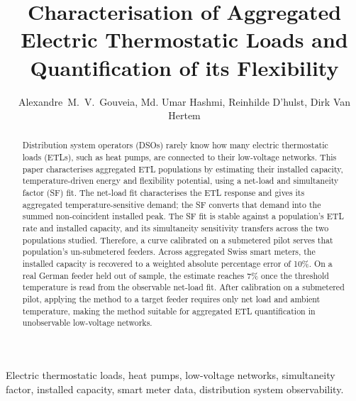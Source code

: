 \documentclass[9pt,journal,a4]{IEEEtran}
\begin{document}
\title{Characterisation of Aggregated Electric Thermostatic Loads and Quantification of its Flexibility}

\author{Alexandre~M.~V.~Gouveia, Md. Umar Hashmi, Reinhilde D'hulst, Dirk Van Hertem}

\maketitle

\begin{abstract}
Distribution system operators (DSOs) rarely know how many electric thermostatic loads (ETLs), such as heat pumps, are connected to their low-voltage networks. This paper characterises aggregated ETL populations by estimating their installed capacity, temperature-driven energy and flexibility potential, using a net-load and simultaneity factor (SF) fit. The net-load fit characterises the ETL response and gives its aggregated temperature-sensitive demand; the SF converts that demand into the summed non-coincident installed peak. The SF fit is stable against a population's ETL rate and installed capacity, and its simultaneity sensitivity transfers across the two populations studied. Therefore, a curve calibrated on a submetered pilot serves that population's un-submetered feeders. Across aggregated Swiss smart meters, the installed capacity is recovered to a weighted absolute percentage error of 10\%. On a real German feeder held out of sample, the estimate reaches 7\% once the threshold temperature is read from the observable net-load fit. After calibration on a submetered pilot, applying the method to a target feeder requires only net load and ambient temperature, making the method suitable for aggregated ETL quantification in unobservable low-voltage networks.
\end{abstract}

\begin{IEEEkeywords}
Electric thermostatic loads, heat pumps, low-voltage networks, simultaneity factor, installed capacity, smart meter data, distribution system observability.
\end{IEEEkeywords}

\end{document}

